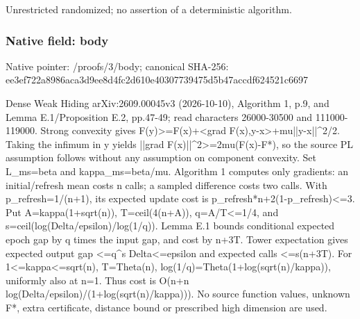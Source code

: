 \documentclass[10pt,a4paper]{article}
\begin{document}
\begingroup\raggedright\sloppy Unrestricted randomized;\allowbreak{} no assertion of a deterministic algorithm.\par\endgroup

\subsubsection{Native field: body}
Native pointer: /proofs/3/body; canonical SHA-256: ee3ef722a8986aca3d9ee8d4fc2d610e40307739475d5b47accdf624521c6697

\begingroup\raggedright\sloppy Dense Weak Hiding arXiv:\allowbreak{}2609.00045v3 (2026-10-10),\allowbreak{} Algorithm 1,\allowbreak{} p.9,\allowbreak{} and Lemma E.1/\allowbreak{}Proposition E.2,\allowbreak{} pp.47-49;\allowbreak{} read characters 26000-30500 and 111000-119000. Strong convexity gives F(y)>=\allowbreak{}F(x)+<grad F(x),\allowbreak{}y-x>+mu||y-x||\textasciicircum{}2/\allowbreak{}2. Taking the infimum in y yields ||grad F(x)||\textasciicircum{}2>=\allowbreak{}2mu(F(x)-F*),\allowbreak{} so the source PL assumption follows without any assumption on component convexity. Set L\_\allowbreak{}ms=\allowbreak{}beta and kappa\_\allowbreak{}ms=\allowbreak{}beta/\allowbreak{}mu. Algorithm 1 computes only gradients:\allowbreak{} an initial/\allowbreak{}refresh mean costs n calls;\allowbreak{} a sampled difference costs two calls. With p\_\allowbreak{}refresh=\allowbreak{}1/\allowbreak{}(n+1),\allowbreak{} its expected update cost is p\_\allowbreak{}refresh*n+2(1-p\_\allowbreak{}refresh)<=\allowbreak{}3. Put A=\allowbreak{}kappa(1+sqrt(n)),\allowbreak{} T=\allowbreak{}ceil(4(n+A)),\allowbreak{} q=\allowbreak{}A/\allowbreak{}T<=\allowbreak{}1/\allowbreak{}4,\allowbreak{} and s=\allowbreak{}ceil(log(Delta/\allowbreak{}epsilon)/\allowbreak{}log(1/\allowbreak{}q)). Lemma E.1 bounds conditional expected epoch gap by q times the input gap,\allowbreak{} and cost by n+3T. Tower expectation gives expected output gap <=\allowbreak{}q\textasciicircum{}s Delta<=\allowbreak{}epsilon and expected calls <=\allowbreak{}s(n+3T). For 1<=\allowbreak{}kappa<=\allowbreak{}sqrt(n),\allowbreak{} T=\allowbreak{}Theta(n),\allowbreak{} log(1/\allowbreak{}q)=\allowbreak{}Theta(1+log(sqrt(n)/\allowbreak{}kappa)),\allowbreak{} uniformly also at n=\allowbreak{}1. Thus cost is O(n+n log(Delta/\allowbreak{}epsilon)/\allowbreak{}(1+log(sqrt(n)/\allowbreak{}kappa))). No source function values,\allowbreak{} unknown F*,\allowbreak{} extra certificate,\allowbreak{} distance bound or prescribed high dimension are used.\par\endgroup
\end{document}
